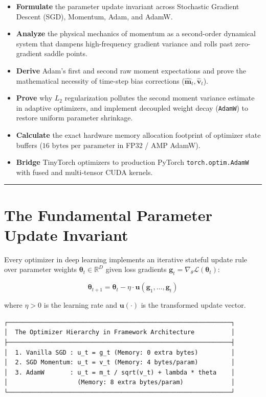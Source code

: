 \documentclass[
  letterpaper,
]{scrbook}
\providecommand{\tightlist}{%
  \setlength{\itemsep}{0pt}\setlength{\parskip}{0pt}}
\begin{document}
\begin{itemize}
\tightlist
\item
  \textbf{Formulate} the parameter update invariant across Stochastic
  Gradient Descent (SGD), Momentum, Adam, and AdamW.
\item
  \textbf{Analyze} the physical mechanics of momentum as a second-order
  dynamical system that dampens high-frequency gradient variance and
  rolls past zero-gradient saddle points.
\item
  \textbf{Derive} Adam's first and second raw moment expectations and
  prove the mathematical necessity of time-step bias corrections
  (\(\hat{\mathbf{m}}_t, \hat{\mathbf{v}}_t\)).
\item
  \textbf{Prove} why \(L_2\) regularization pollutes the second moment
  variance estimate in adaptive optimizers, and implement decoupled
  weight decay (\texttt{AdamW}) to restore uniform parameter shrinkage.
\item
  \textbf{Calculate} the exact hardware memory allocation footprint of
  optimizer state buffers (\(16\text{ bytes per parameter}\) in FP32 /
  AMP AdamW).
\item
  \textbf{Bridge} TinyTorch optimizers to production PyTorch
  \texttt{torch.optim.AdamW} with fused and multi-tensor CUDA kernels.
\end{itemize}

\begin{center}\rule{0.5\linewidth}{0.5pt}\end{center}

\section{The Fundamental Parameter Update
Invariant}\label{the-fundamental-parameter-update-invariant}

Every optimizer in deep learning implements an iterative stateful update
rule over parameter weights \(\mathbf{\theta}_t \in \mathbb{R}^D\) given
loss gradients
\(\mathbf{g}_t = \nabla_\theta \mathcal{L}(\mathbf{\theta}_t)\):

\[\mathbf{\theta}_{t+1} = \mathbf{\theta}_t - \eta \cdot \mathbf{u}(\mathbf{g}_1, \dots, \mathbf{g}_t)\]

where \(\eta > 0\) is the learning rate and \(\mathbf{u}(\cdot)\) is the
transformed update vector.

\begin{verbatim}
┌─────────────────────────────────────────────────────────────┐
│  The Optimizer Hierarchy in Framework Architecture          │
├─────────────────────────────────────────────────────────────┤
│  1. Vanilla SGD : u_t = g_t (Memory: 0 extra bytes)         │
│  2. SGD Momentum: u_t = v_t (Memory: 4 bytes/param)         │
│  3. AdamW       : u_t = m_t / sqrt(v_t) + lambda * theta    │
│                   (Memory: 8 extra bytes/param)             │
└─────────────────────────────────────────────────────────────┘
\end{verbatim}
\end{document}
